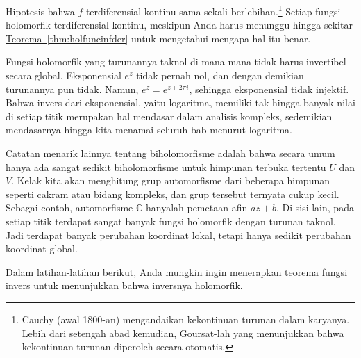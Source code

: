 \documentclass[12pt,openany]{book}
\newcommand{\C}{{\mathbb{C}}}
\theoremstyle{plain}
\theoremstyle{remark}
\theoremstyle{definition}
\theoremstyle{exercise}
\theoremstyle{example}
\newcommand{\thmref}[1]{\hyperref[#1]{Teorema~\ref*{#1}}}
\begin{document}
Hipotesis bahwa $f$ terdiferensial kontinu sama sekali
berlebihan.\footnote{Cauchy (awal 1800-an)
mengandaikan kekontinuan turunan dalam karyanya.
Lebih dari setengah abad kemudian, Goursat-lah yang menunjukkan bahwa kekontinuan
turunan diperoleh secara otomatis.}
Setiap fungsi holomorfik terdiferensial
kontinu, meskipun Anda harus menunggu hingga sekitar
\thmref{thm:holfuncinfder} untuk mengetahui mengapa hal itu benar.

Fungsi holomorfik yang turunannya taknol
di mana-mana tidak harus invertibel secara global.  Eksponensial $e^z$
tidak pernah nol, dan dengan demikian turunannya pun tidak.  Namun, $e^{z} = e^{z+2\pi i}$,
sehingga
eksponensial tidak injektif.
Bahwa invers dari
eksponensial, yaitu logaritma,
memiliki tak hingga banyak nilai di setiap titik merupakan hal mendasar dalam analisis kompleks,
sedemikian mendasarnya hingga kita menamai seluruh bab menurut logaritma.

Catatan menarik lainnya tentang biholomorfisme adalah bahwa secara umum
hanya ada sangat sedikit biholomorfisme untuk himpunan terbuka tertentu $U$ dan $V$.  Kelak kita akan
menghitung grup automorfisme dari beberapa himpunan seperti cakram atau
bidang kompleks, dan grup tersebut ternyata cukup kecil.
Sebagai contoh, automorfisme $\C$ hanyalah pemetaan afin $a
z + b$.  Di sisi lain, pada setiap titik terdapat sangat banyak
fungsi holomorfik dengan turunan taknol.  Jadi terdapat banyak perubahan
koordinat lokal, tetapi hanya sedikit perubahan koordinat global.

Dalam latihan-latihan berikut, Anda mungkin ingin menerapkan teorema
fungsi invers untuk menunjukkan bahwa inversnya holomorfik.
\end{document}
